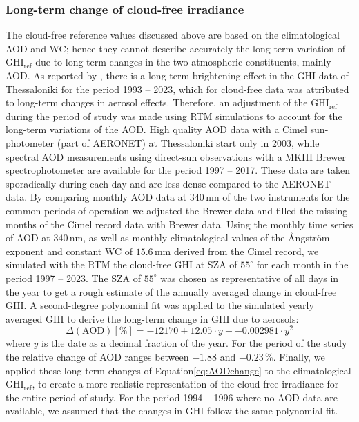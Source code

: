 \documentclass[preprint, 5p,
authoryear]{elsarticle} %
\begin{document}
\hypertarget{long-term-change-of-cloud-free-irradiance}{%
\subsubsection{Long-term change of cloud-free
irradiance}\label{long-term-change-of-cloud-free-irradiance}}

The cloud-free reference values discussed above are based on the
climatological AOD and WC; hence they cannot describe accurately the
long-term variation of \(\text{GHI}_\text{ref}\) due to long-term
changes in the two atmospheric constituents, mainly AOD. As reported by
\citet{Natsis2023}, there is a long-term brightening effect in the GHI
data of Thessaloniki for the period 1993 -- 2023, which for cloud-free
data was attributed to long-term changes in aerosol effects. Therefore,
an adjustment of the \(\text{GHI}_\text{ref}\) during the period of
study was made using RTM simulations to account for the long-term
variations of the AOD. High quality AOD data with a Cimel sun-photometer
(part of AERONET) at Thessaloniki start only in 2003, while spectral AOD
measurements using direct-sun observations with a MKIII Brewer
spectrophotometer are available for the period 1997 -- 2017. These data
are taken sporadically during each day and are less dense compared to
the AERONET data. By comparing monthly AOD data at \(340\,\text{nm}\) of
the two instruments for the common periods of operation we adjusted the
Brewer data and filled the missing months of the Cimel record data with
Brewer data. Using the monthly time series of AOD at \(340\,\text{nm}\),
as well as monthly climatological values of the Ångström exponent and
constant WC of \(15.6\,\text{mm}\) derived from the Cimel record, we
simulated with the RTM the cloud-free GHI at SZA of \(55^\circ\) for
each month in the period 1997 -- 2023. The SZA of \(55^\circ\) was
chosen as representative of all days in the year to get a rough estimate
of the annually averaged change in cloud-free GHI. A second-degree
polynomial fit was applied to the simulated yearly averaged GHI to
derive the long-term change in GHI due to aerosols: \begin{equation}
\Delta(\text{AOD}) [\%] = -12170 + 12.05 \cdot y + -0.002981 \cdot y^2 \label{eq:AODchange}
\end{equation} where \(y\) is the date as a decimal fraction of the
year. For the period of the study the relative change of AOD ranges
between \(-1.88\) and \(-0.23\,\%\). Finally, we applied these long-term
changes of Equation\nobreakspace{}\ref{eq:AODchange} to the
climatological \(\text{GHI}_\text{ref}\), to create a more realistic
representation of the cloud-free irradiance for the entire period of
study. For the period 1994 -- 1996 where no AOD data are available, we
assumed that the changes in GHI follow the same polynomial fit.
\end{document}
